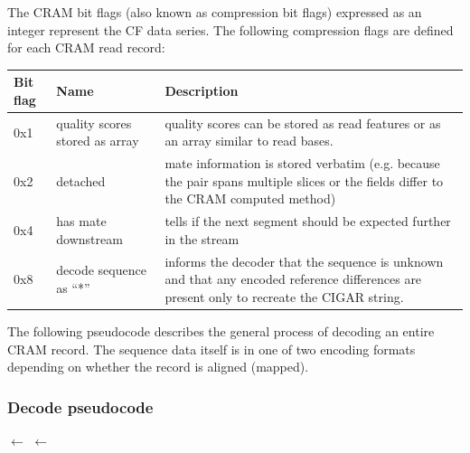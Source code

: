 \documentclass[a4paper]{article}
\begin{document}
The CRAM bit flags (also known as compression bit flags) expressed as an integer represent the CF data series. 
The following compression flags are defined for each CRAM read record:

\begin{tabular}{|>{\raggedright}p{39pt}|>{\raggedright}p{150pt}|>{\raggedright}p{242pt}|}
\hline
\textbf{Bit flag} & \textbf{Name} & \textbf{Description}\tabularnewline
\hline
0x1 & quality scores stored as array & quality scores can be stored as read features
or as an array similar to read bases.\tabularnewline
\hline
0x2 & detached & mate information is stored verbatim (e.g. because the pair spans multiple slices or the fields differ to the CRAM computed method)\tabularnewline
\hline
0x4 & has mate downstream & tells if the next segment should be expected further
in the stream\tabularnewline
\hline
0x8 & decode sequence as ``*'' & informs the decoder that the sequence
is unknown and that any encoded reference differences are present only to
recreate the CIGAR string.\tabularnewline
\hline
\end{tabular}


The following pseudocode describes the general process of decoding an entire CRAM record.
The sequence data itself is in one of two encoding formats depending on whether the record is aligned (mapped).

\subsubsection*{\textbf{Decode pseudocode}}
\newlength{\maxwidth}
\newcommand{\algalign}[2] %
{\makebox[\maxwidth][l]{$#1{}$}${}#2$}

\begin{algorithmic}[1]
\settowidth{\maxwidth}{CRAM\_flags\quad}
\State \algalign{BAM\_flags}{\gets}  
\State \algalign{CRAM\_flags}{\gets} 
\State {}
\State {}
\State {}
\State {}
\Statex

  \State {}
\Else
  \State {}
\EndIf
\EndProcedure
\end{algorithmic}
\end{document}
